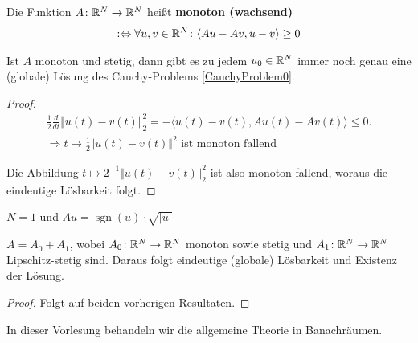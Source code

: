\begin{definition}[Monotonie]
Die Funktion $A\colon\mathbb{R}^N\to\mathbb{R}^N$ heißt \textbf{monoton (wachsend)}
\begin{align*}
:\Leftrightarrow\forall u,v\in\mathbb{R}^N\colon\langle Au-Av,u-v\rangle\geq 0
\end{align*}
\end{definition}

\begin{lemma}
Ist $A$ monoton und stetig, dann gibt es zu jedem $u_0\in\mathbb{R}^N$ immer noch genau eine (globale) Lösung des Cauchy-Problems \eqref{CauchyProblem0}.
\end{lemma}
\begin{proof}
\begin{align*}
	\frac{1}{2}\frac{d}{dt}\Vert u(t)-v(t)\Vert_2^2=-\langle u(t)-v(t),Au(t)-Av(t)\rangle\leq 0.\\
	\Longrightarrow t\mapsto\frac{1}{2}\Vert u(t)-v(t)\Vert^2\text{ ist monoton fallend}
\end{align*}

Die Abbildung $t\mapsto 2^{-1}\Vert u(t)-v(t)\Vert_2^2$ ist also monoton fallend, woraus die eindeutige Lösbarkeit folgt. 
\end{proof}

\begin{beispiel}
$N=1$ und $Au=\operatorname{sgn}(u)\cdot\sqrt{\vert u\vert}$
\end{beispiel}

\begin{korollar}
$A=A_0+A_1$, wobei $A_0\colon\mathbb{R}^N\to\mathbb{R}^N$ monoton sowie stetig und $A_1\colon\mathbb{R}^N\to\mathbb{R}^N$ Lipschitz-stetig sind. Daraus folgt eindeutige (globale) Lösbarkeit und Existenz der Lösung.
\end{korollar}
\begin{proof}
Folgt auf beiden vorherigen Resultaten.
\end{proof}

In dieser Vorlesung behandeln wir die allgemeine Theorie in Banachräumen.